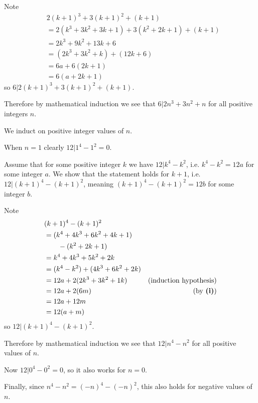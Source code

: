\begin{questions}
\begin{partquestions}{\roman*}
        Note
        \begin{align*}
            &2(k+1)^3 + 3(k+1)^2 + (k+1)\\
            &= 2(k^3+3k^2+3k+1) + 3(k^2+2k+1) + (k+1)\\
            &= 2k^3 + 9k^2 + 13k + 6\\
            &= (2k^3 + 3k^2 + k) + (12k + 6)\\
            &= 6a + 6(2k + 1)\\
            &= 6(a + 2k + 1)
        \end{align*}
        so $6 \vert 2(k+1)^3 + 3(k+1)^2 + (k+1)$.

        Therefore by mathematical induction we see that $6 \vert 2n^3 + 3n^2 + n$ for all positive integers $n$.

        \item We induct on positive integer values of $n$.

        When $n = 1$ clearly $12 \vert 1^4 - 1^2 = 0$.

        Assume that for some positive integer $k$ we have $12 \vert k^4 - k^2$, i.e. $k^4 - k^2 = 12a$ for some integer $a$. We show that the statement holds for $k+1$, i.e. $12 \vert (k+1)^4 - (k+1)^2$, meaning $(k+1)^4 - (k+1)^2 = 12b$ for some integer $b$.

        Note
        \begin{align*}
            &(k+1)^4 - (k+1)^2\\
            &= (k^4 + 4k^3 + 6k^2 + 4k + 1)\\
            &\quad\quad- (k^2 + 2k + 1)\\
            &= k^4 + 4k^3 + 5k^2 + 2k\\
            &= (k^4 - k^2) + (4k^3 + 6k^2 + 2k)\\
            &= 12a + 2(2k^3 + 3k^2 + 1k) & (\text{induction hypothesis})\\
            &= 12a + 2(6m) & (\text{by \textbf{(i)}})\\
            &= 12a + 12m\\
            &= 12(a+m)
        \end{align*}
        so $12 \vert (k+1)^4 - (k+1)^2$.

        Therefore by mathematical induction we see that $12 \vert n^4 - n^2$ for all positive values of $n$.

        Now $12 \vert 0^4 - 0^2 = 0$, so it also works for $n = 0$.

        Finally, since $n^4 - n^2 = (-n)^4 - (-n)^2$, this also holds for negative values of $n$.
    \end{partquestions}


\end{questions}
